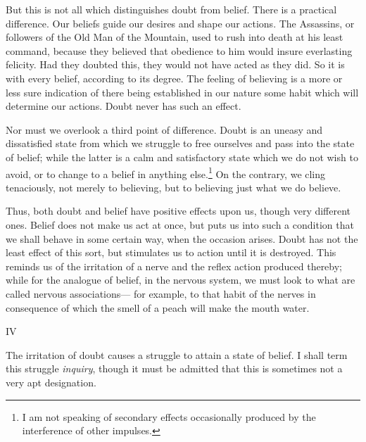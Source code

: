 \documentclass[]{article}
\newcounter{authornote}[page]
\newcommand{\authornote}[1]{\renewcommand{\thefootnote}{\fnsymbol{footnote}}\stepcounter{authornote}\footnote[\value{authornote}]{#1}\renewcommand{\thefootnote}{\arabic{footnote}}}
\newcommand{\itemsection}[1]{\bigskip\centerline{#1}\nopagebreak}
\begin{document}
But this is not all which distinguishes doubt from belief. There is a practical difference. Our beliefs guide our desires and shape our actions. The Assassins, or followers of the Old Man of the Mountain, used to rush into death at his least command, because they believed that obedience to him would insure everlasting felicity. Had they doubted this, they would not have acted as they did. So it is with every belief, according to its degree. The feeling of believing is a more or less sure indication of there being established in our nature some habit which will determine our actions. Doubt never has such an effect.

Nor must we overlook a third point of difference. Doubt is an uneasy and dissatisfied state from which we struggle to free ourselves and pass into the state of belief; while the latter is a calm and satisfactory state which we do not wish to avoid, or to change to a belief in anything else.\authornote{ I am not speaking of secondary effects occasionally produced by the interference of other impulses.} On the contrary, we cling tenaciously, not merely to believing, but to believing just what we do believe.


Thus, both doubt and belief have positive effects upon us, though very different ones. Belief does not make us act at once, but puts us into such a condition that we shall behave in some certain way, when the occasion arises. Doubt has not the least effect of this sort, but stimulates us to action until it is destroyed. This reminds us of the irritation of a nerve and the reflex action produced thereby; while for the analogue of belief, in the nervous system, we must look to what are called nervous associations--- for example, to that habit of the nerves in consequence of which the smell of a peach will make the mouth water.

\itemsection{IV}

The irritation of doubt causes a struggle to attain a state of belief. I shall term this struggle \emph{inquiry}, though it must be admitted that this is sometimes not a very apt designation.
\end{document}
